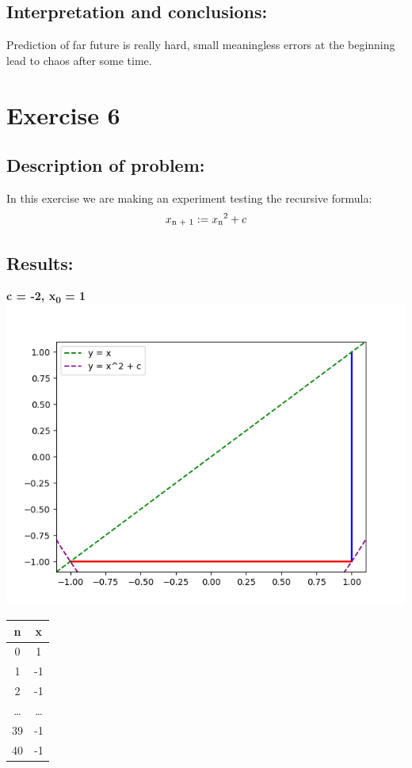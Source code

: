 \documentclass{article}
\begin{document}
 \subsection*{Interpretation and conclusions:}
Prediction of far future is really hard, small meaningless errors at the beginning lead to chaos after some time.
\newpage
\section*{Exercise 6}
\subsection*{Description of problem:}
In this exercise we are making an experiment testing the recursive formula:
\[
    x\textsubscript{n + 1} := x\textsubscript{n}^{2} + c
\]

\subsection*{Results:}

\begin{center}
    \textbf{c = -2, x\textsubscript{0} = 1}
    \includegraphics[scale=0.8]{1}
        \begin{tabular}{| c | c |}
            \hline
            n & x\\
            \hline
            0 & 1\\
            1 & -1\\
            2 & -1 \\
            \dots & \dots \\
            39 & -1\\
            40 & -1\\
            \hline
        \end{tabular}
        \end{center}
\end{document}
